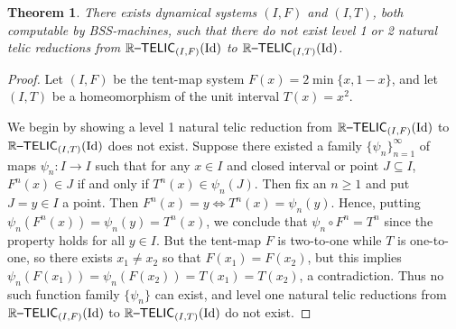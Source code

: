 \documentclass{amsart}
\theoremstyle{theorem}
\newtheorem{theorem}{Theorem}[section]
\theoremstyle{remark}
\DeclareMathOperator{\Id}{Id}
\newcommand{\ccRTELIC}{\mathbb{R}\textsf{\upshape --TELIC}}
\begin{document}
\begin{theorem}\label{thmRulingOutNaturalTelic}
There exists dynamical systems $(I, F)$ and $(I, T)$, both computable by BSS-machines, such that there do not exist level 1 or 2 natural telic reductions from $\ccRTELIC_{(I, F)}(\Id)$ to $\ccRTELIC_{(I, T)}(\Id)$.
\end{theorem}
\begin{proof}
Let $(I, F)$ be the tent-map system $F(x) = 2\min\{x, 1-x\}$, and let $(I, T)$ be a homeomorphism of the unit interval $T(x) = x^2$.

We begin by showing a level 1 natural telic reduction from $\ccRTELIC_{(I, F)}(\Id)$ to $\ccRTELIC_{(I, T)}(\Id)$ does not exist. Suppose there existed a family $\{\psi_n\}_{n=1}^\infty$ of maps $\psi_n:I\rightarrow I$ such that for any $x \in I$ and closed interval or point $J \subseteq I$, $F^n(x) \in J$ if and only if $T^n(x) \in \psi_n(J)$. Then fix an $n \geq 1$ and put $J = y \in I$ a point. Then $F^n(x) = y \iff T^n(x) = \psi_n(y)$. Hence, putting $\psi_n(F^n(x)) = \psi_n(y) = T^n(x)$, we conclude that $\psi_n\circ F^n = T^n$ since the property holds for all $y \in I$. But the tent-map $F$ is two-to-one while $T$ is one-to-one, so there exists $x_1\neq x_2$ so that $F(x_1) = F(x_2)$, but this implies $\psi_n(F(x_1)) = \psi_n(F(x_2)) = T(x_1)=T(x_2)$, a contradiction. Thus no such function family $\{\psi_n\}$ can exist, and level one natural telic reductions from $\ccRTELIC_{(I, F)}(\Id)$ to $\ccRTELIC_{(I, T)}(\Id)$ do not exist.


\end{proof}
\end{document}
